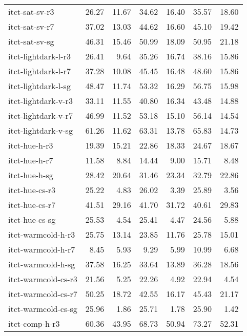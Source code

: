 \begin{tabular}{lrrrrrr}
itct-sat-sv-r3      &   26.27 &   11.67 &   34.62 &   16.40 &   35.57 &   18.60 \\
itct-sat-sv-r7      &   37.02 &   13.03 &   44.62 &   16.60 &   45.10 &   19.42 \\
itct-sat-sv-sg      &   46.31 &   15.46 &   50.99 &   18.09 &   50.95 &   21.18 \\
itct-lightdark-l-r3 &   26.41 &    9.64 &   35.26 &   16.74 &   38.16 &   15.86 \\
itct-lightdark-l-r7 &   37.28 &   10.08 &   45.45 &   16.48 &   48.60 &   15.86 \\
itct-lightdark-l-sg &   48.47 &   11.74 &   53.32 &   16.29 &   56.75 &   15.98 \\
itct-lightdark-v-r3 &   33.11 &   11.55 &   40.80 &   16.34 &   43.48 &   14.88 \\
itct-lightdark-v-r7 &   46.99 &   11.52 &   53.18 &   15.10 &   56.14 &   14.54 \\
itct-lightdark-v-sg &   61.26 &   11.62 &   63.31 &   13.78 &   65.83 &   14.73 \\
itct-hue-h-r3       &   19.39 &   15.21 &   22.86 &   18.33 &   24.67 &   18.67 \\
itct-hue-h-r7       &   11.58 &    8.84 &   14.44 &    9.00 &   15.71 &    8.48 \\
itct-hue-h-sg       &   28.42 &   20.64 &   31.46 &   23.34 &   32.79 &   22.86 \\
itct-hue-cs-r3      &   25.22 &    4.83 &   26.02 &    3.39 &   25.89 &    3.56 \\
itct-hue-cs-r7      &   41.51 &   29.16 &   41.70 &   31.72 &   40.61 &   29.83 \\
itct-hue-cs-sg      &   25.53 &    4.54 &   25.41 &    4.47 &   24.56 &    5.88 \\
itct-warmcold-h-r3  &   25.75 &   13.14 &   23.85 &   11.76 &   25.78 &   15.01 \\
itct-warmcold-h-r7  &    8.45 &    5.93 &    9.29 &    5.99 &   10.99 &    6.68 \\
itct-warmcold-h-sg  &   37.58 &   16.25 &   33.64 &   13.89 &   36.28 &   18.56 \\
itct-warmcold-cs-r3 &   21.56 &    5.25 &   22.26 &    4.92 &   22.94 &    4.54 \\
itct-warmcold-cs-r7 &   50.25 &   18.72 &   42.55 &   16.17 &   45.43 &   21.17 \\
itct-warmcold-cs-sg &   25.96 &    1.86 &   25.71 &    1.78 &   25.90 &    1.42 \\
itct-comp-h-r3      &   60.36 &   43.95 &   68.73 &   50.94 &   73.27 &   52.31 \\

\end{tabular}
